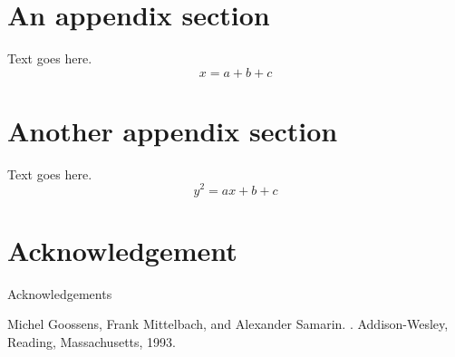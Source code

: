 \documentclass{pramana}
\begin{document}

\appendix

\section{An appendix section}
Text goes here.
\begin{equation}
x=a+b+c
\end{equation}
\section{Another appendix section}
Text goes here.
\begin{equation}
y^2=ax+b+c
\end{equation}
\section*{Acknowledgement}
Acknowledgements


\begin{thebibliography}{99} 
Michel Goossens, Frank Mittelbach, and Alexander Samarin. 
. 
Addison-Wesley, Reading, Massachusetts, 1993.
\end{thebibliography}
\end{document}
